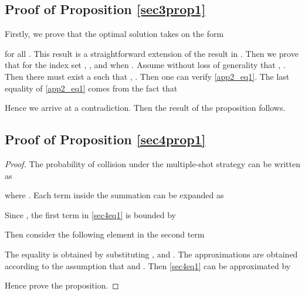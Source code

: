 \documentclass[10pt,final,journal,letterpaper]{IEEEtran}
\begin{document}
\subsection{Proof of Proposition \ref{sec3prop1}}
\begin{IEEEproof}
Firstly, we prove that the optimal solution takes on the form

for all . This result is a straightforward extension of the result in \cite{huang2009optimal}. Then we prove that for the index set , ,  and  when . Assume without loss of generality that , . Then there must exist a  such that , . Then one can verify \eqref{app2_eq1}. The last equality of \eqref{app2_eq1} comes from the fact that

Hence we arrive at a contradiction. Then the result of the proposition follows.
\end{IEEEproof}
\begin{figure*}[!t]
\normalsize

\hrulefill
\vspace*{4pt}
\end{figure*}

\subsection{Proof of Proposition \ref{sec4prop1}}
\begin{proof}
The probability of collision under the multiple-shot strategy can be written as

where . Each term inside the summation can be expanded as

Since , the first term in \eqref{sec4eq1} is bounded by 

Then consider the following element in the second term

The equality is obtained by substituting , and . The approximations are obtained according to the assumption that  and . Then \eqref{sec4eq1} can be approximated by

Hence prove the proposition.
\end{proof}

\ifCLASSOPTIONcaptionsoff
  \newpage
\fi



\end{document}
